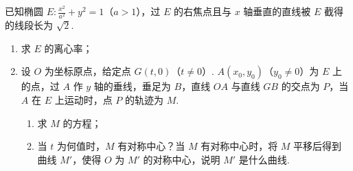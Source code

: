 \documentclass[UTF8,a4paper,oneside,11pt]{ctexbook}
\begin{document}
\begin{problem}
已知椭圆 \(E:\frac{x^2}{a^2}+y^2=1\)（\(a>1\)），过 \(E\) 的右焦点且与 \(x\) 轴垂直的直线被 \(E\) 截得的线段长为 \(\sqrt{2}\).

\begin{enumerate}
\item 求 \(E\) 的离心率；
\item 设 \(O\) 为坐标原点，给定点 \(G\left( t,0 \right)\)（\(t\ne 0\)）. \(A\left( x_0,y_0 \right)\)（\(y_0\ne 0\)）为 \(E\) 上的点，过 \(A\) 作 \(y\) 轴的垂线，垂足为 \(B\)，直线 \(OA\) 与直线 \(GB\) 的交点为 \(P\)，当 \(A\) 在 \(E\) 上运动时，点 \(P\) 的轨迹为 \(M\).
    \begin{enumerate}
    \item 求 \(M\) 的方程；
    \item 当 \(t\) 为何值时，\(M\) 有对称中心？当 \(M\) 有对称中心时，将 \(M\) 平移后得到曲线 \(M'\)，使得 \(O\) 为 \(M'\) 的对称中心，说明 \(M'\) 是什么曲线.
    \end{enumerate}
\end{enumerate}
\end{problem}
\end{document}
